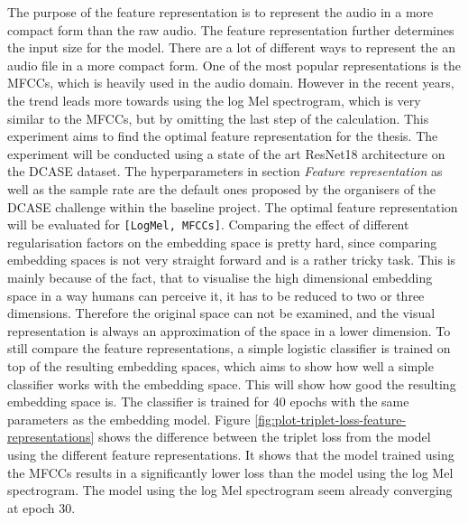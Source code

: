 \noindent
The purpose of the feature representation is to represent the audio in a more compact form than the raw audio. The feature representation further determines the input size for the model. There are a lot of different ways to represent the an audio file in a more compact form. One of the most popular representations is the MFCCs, which is heavily used in the audio domain. However in the recent years, the trend leads more towards using the log Mel spectrogram, which is very similar to the MFCCs, but by omitting the last step of the calculation. This experiment aims to find the optimal feature representation for the thesis.
\newline
\newline
The experiment will be conducted using a state of the art ResNet18 architecture on the DCASE dataset. The hyperparameters in section \textit{Feature representation} as well as the sample rate are the default ones proposed by the organisers of the DCASE challenge within the baseline project.
The optimal feature representation will be evaluated for \texttt{[LogMel, MFCCs]}.
\newline
\newline
Comparing the effect of different regularisation factors on the embedding space is pretty hard, since comparing embedding spaces is not very straight forward and is a rather tricky task. This is mainly because of the fact, that to visualise the high dimensional embedding space in a way humans can perceive it, it has to be reduced to two or three dimensions. Therefore the original space can not be examined, and the visual representation is always an approximation of the space in a lower dimension. To still compare the feature representations, a simple logistic classifier is trained on top of the resulting embedding spaces, which aims to show how well a simple classifier works with the embedding space. This will show how good the resulting embedding space is. The classifier is trained for 40 epochs with the same parameters as the embedding model.
\newline
\newline
Figure \ref{fig:plot-triplet-loss-feature-representations} shows the difference between the triplet loss from the model using the different feature representations. It shows that the model trained using the MFCCs results in a significantly lower loss than the model using the log Mel spectrogram. The model using the log Mel spectrogram seem already converging at epoch 30.
\newline
\newline
